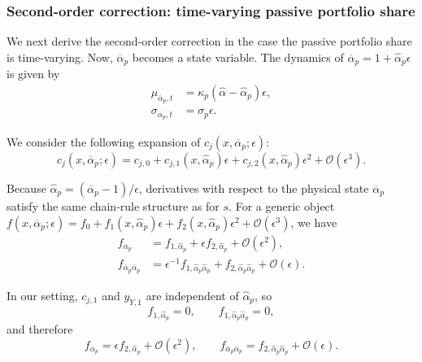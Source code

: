\subsubsection{Second-order correction: time-varying passive portfolio share}\label{app:prop_second_order_time_varying}

We next derive the second-order correction in the case the passive portfolio share is time-varying. 
Now, $\overline{\alpha}_p$ becomes a state variable. 
The dynamics of $\overline{\alpha}_p = 1 + \hat{\alpha}_p \epsilon$ is given by
\begin{align}
    \mu_{\overline{\alpha}_p,t} &= \kappa_p (\hat{\alpha} - \hat{\alpha}_p) \epsilon, \\
    \sigma_{\overline{\alpha}_p,t} &= \sigma_p \epsilon. 
\end{align}

We consider the following expansion of $c_j(x, \overline{\alpha}_p;\epsilon)$:
\begin{equation}
    c_{j}(x, \overline{\alpha}_p;\epsilon) = c_{j,0} + c_{j,1}(x, \hat{\alpha}_p) \epsilon + c_{j,2}(x, \hat{\alpha}_p) \epsilon^2 + \mathcal{O}(\epsilon^3). 
\end{equation}

Because $\hat{\alpha}_p=(\overline{\alpha}_p-1)/\epsilon$, derivatives with respect to the physical state $\overline{\alpha}_p$ satisfy the same chain-rule structure as for $s$.
For a generic object $f(x,\overline{\alpha}_p;\epsilon)=f_0+f_1(x,\hat{\alpha}_p)\epsilon+f_2(x,\hat{\alpha}_p)\epsilon^2+\mathcal{O}(\epsilon^3)$, we have
\begin{align}
    f_{\overline{\alpha}_p}
    &= f_{1,\hat{\alpha}_p} + \epsilon f_{2,\hat{\alpha}_p} + \mathcal{O}(\epsilon^2),\\
    f_{\overline{\alpha}_p\overline{\alpha}_p}
    &= \epsilon^{-1} f_{1,\hat{\alpha}_p\hat{\alpha}_p} + f_{2,\hat{\alpha}_p\hat{\alpha}_p} + \mathcal{O}(\epsilon).
\end{align}

In our setting, $c_{j,1}$ and $y_{Y,1}$ are independent of $\hat{\alpha}_p$, so
\begin{equation}
    f_{1,\hat{\alpha}_p} = 0, \qquad f_{1,\hat{\alpha}_p\hat{\alpha}_p} = 0,
\end{equation}
and therefore
\begin{equation}
    f_{\overline{\alpha}_p} = \epsilon f_{2,\hat{\alpha}_p} + \mathcal{O}(\epsilon^2),
    \qquad
    f_{\overline{\alpha}_p\overline{\alpha}_p} = f_{2,\hat{\alpha}_p\hat{\alpha}_p} + \mathcal{O}(\epsilon).
\end{equation}

